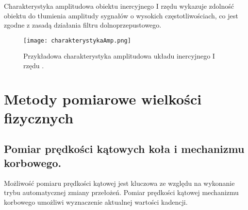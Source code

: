 Charakterystyka amplitudowa obiektu inercyjnego I rzędu wykazuje zdolność obiektu do tłumienia amplitudy sygnałów o wysokich częstotliwościach, co jest zgodne z zasadą działania filtru dolnoprzepustowego.
\begin{figure}[h]
    \centering
    \texttt{[image: charakterystykaAmp.png]}
    \caption{Przykładowa charakterystyka amplitudowa układu inercyjnego I rzędu \cite{charakterystykaAmp}.}
    \label{fig:charamp}
\end{figure}

\label{filtrRc}
\section{Metody pomiarowe wielkości fizycznych}
\subsection{Pomiar prędkości kątowych koła i mechanizmu korbowego.}

Możliwość pomiaru prędkości kątowej jest kluczowa ze względu na wykonanie trybu automatycznej zmiany przełożeń. Pomiar prędkości kątowej mechanizmu korbowego umożliwi wyznaczenie aktualnej wartości kadencji.

